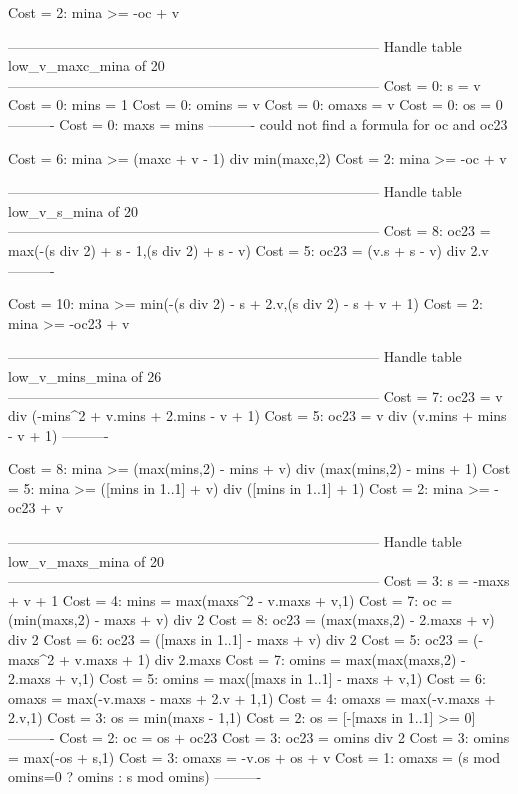 Cost =  2:  mina >= -oc + v

--------------------------------------------------------------------------------
Handle table low_v_maxc_mina of 20
--------------------------------------------------------------------------------
Cost =  0:  s     = v
Cost =  0:  mins  = 1
Cost =  0:  omins = v
Cost =  0:  omaxs = v
Cost =  0:  os    = 0
----------
Cost =  0:  maxs  = mins
----------
could not find a formula for oc and oc23

Cost =  6:  mina >= (maxc + v - 1) div min(maxc,2)
Cost =  2:  mina >= -oc + v

--------------------------------------------------------------------------------
Handle table low_v_s_mina of 20
--------------------------------------------------------------------------------
Cost =  8:  oc23 = max(-(s div 2) + s - 1,(s div 2) + s - v)
Cost =  5:  oc23 = (v.s + s - v) div 2.v
----------

Cost = 10:  mina >= min(-(s div 2) - s + 2.v,(s div 2) - s + v + 1)
Cost =  2:  mina >= -oc23 + v

--------------------------------------------------------------------------------
Handle table low_v_mins_mina of 26
--------------------------------------------------------------------------------
Cost =  7:  oc23 = v div (-mins^2 + v.mins + 2.mins - v + 1)
Cost =  5:  oc23 = v div (v.mins + mins - v + 1)
----------

Cost =  8:  mina >= (max(mins,2) - mins + v) div (max(mins,2) - mins + 1)
Cost =  5:  mina >= ([mins in 1..1] + v) div ([mins in 1..1] + 1)
Cost =  2:  mina >= -oc23 + v

--------------------------------------------------------------------------------
Handle table low_v_maxs_mina of 20
--------------------------------------------------------------------------------
Cost =  3:  s     = -maxs + v + 1
Cost =  4:  mins  = max(maxs^2 - v.maxs + v,1)
Cost =  7:  oc    = (min(maxs,2) - maxs + v) div 2
Cost =  8:  oc23  = (max(maxs,2) - 2.maxs + v) div 2
Cost =  6:  oc23  = ([maxs in 1..1] - maxs + v) div 2
Cost =  5:  oc23  = (-maxs^2 + v.maxs + 1) div 2.maxs
Cost =  7:  omins = max(max(maxs,2) - 2.maxs + v,1)
Cost =  5:  omins = max([maxs in 1..1] - maxs + v,1)
Cost =  6:  omaxs = max(-v.maxs - maxs + 2.v + 1,1)
Cost =  4:  omaxs = max(-v.maxs + 2.v,1)
Cost =  3:  os    = min(maxs - 1,1)
Cost =  2:  os    = [-[maxs in 1..1] >= 0]
----------
Cost =  2:  oc    = os + oc23
Cost =  3:  oc23  = omins div 2
Cost =  3:  omins = max(-os + s,1)
Cost =  3:  omaxs = -v.os + os + v
Cost =  1:  omaxs = (s mod omins=0 ? omins : s mod omins)
----------

